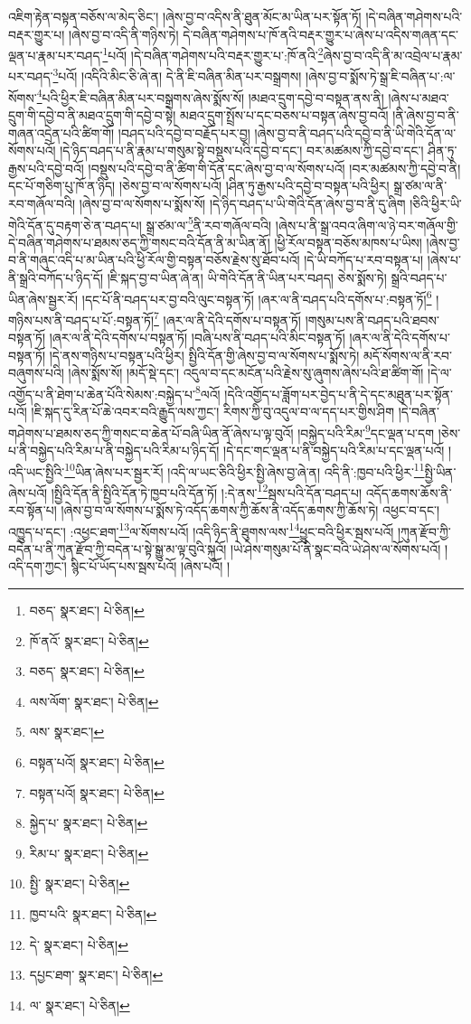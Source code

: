 འཇིག་རྟེན་བསྟན་བཅོས་ལ་མེད་ཅིང་། །ཞེས་བྱ་བ་འདིས་ནི་ཐུན་མོང་མ་ཡིན་པར་སྟོན་ཏོ། །དེ་བཞིན་གཤེགས་པའི་བརྡར་གྱུར་པ། །ཞེས་བྱ་བ་འདི་ནི་གཉིས་ཏེ། དེ་བཞིན་གཤེགས་པ་ཁོ་ནའི་བརྡར་གྱུར་པ་ཞེས་པ་འདིས་གཞན་དང་ལྡན་པ་རྣམ་པར་བཤད་\footnote{བཅད་  སྣར་ཐང་།  པེ་ཅིན། }པའོ། །དེ་བཞིན་གཤེགས་པའི་བརྡར་གྱུར་པ་:ཁོ་ནའི་\footnote{ཁོ་ནའོ་  སྣར་ཐང་།  པེ་ཅིན། }ཞེས་བྱ་བ་འདི་ནི་མ་འབྲེལ་པ་རྣམ་པར་བཤད་\footnote{བཅད་  སྣར་ཐང་།  པེ་ཅིན། }པའོ། །འདིའི་མིང་ཅི་ཞེ་ན། དེ་ནི་ཇི་བཞིན་མིན་པར་བསྒྲགས། །ཞེས་བྱ་བ་སྨོས་ཏེ་སྒྲ་ཇི་བཞིན་པ་:ལ་སོགས་\footnote{ལས་ལོག་  སྣར་ཐང་།  པེ་ཅིན། }པའི་ཕྱིར་ཇི་བཞིན་མིན་པར་བསྒྲགས་ཞེས་སྨོས་སོ། །མཐའ་དྲུག་དབྱེ་བ་བསྟན་ནས་ནི། །ཞེས་པ་མཐའ་དྲུག་གི་དབྱེ་བ་ནི་མཐའ་དྲུག་གི་དབྱེ་བ་སྟེ། མཐའ་དྲུག་སྤྲོས་པ་དང་བཅས་པ་བསྟན་ཞེས་བྱ་བའོ། །ནི་ཞེས་བྱ་བ་ནི་གཞན་འདྲེན་པའི་ཚིག་གོ། །བཤད་པའི་དབྱེ་བ་བརྗོད་པར་བྱ། །ཞེས་བྱ་བ་ནི་བཤད་པའི་དབྱེ་བ་ནི་ཡི་གེའི་དོན་ལ་སོགས་པའོ། །དེ་ཉིད་བཤད་པ་ནི་རྣམ་པ་གསུམ་སྟེ་བསྡུས་པའི་དབྱེ་བ་དང་། བར་མཚམས་ཀྱི་དབྱེ་བ་དང་། ཤིན་ཏུ་རྒྱས་པའི་དབྱེ་བའོ། །བསྡུས་པའི་དབྱེ་བ་ནི་ཚིག་གི་དོན་དང་ཞེས་བྱ་བ་ལ་སོགས་པའོ། །བར་མཚམས་ཀྱི་དབྱེ་བ་ནི། དང་པོ་གཅིག་པུ་ཁོ་ན་ཉིད། །ཅེས་བྱ་བ་ལ་སོགས་པའོ། །ཤིན་ཏུ་རྒྱས་པའི་དབྱེ་བ་བསྟན་པའི་ཕྱིར། སྒྲ་ཙམ་ལ་ནི་རབ་གཞོལ་བའི། །ཞེས་བྱ་བ་ལ་སོགས་པ་སྨོས་སོ། །དེ་ཉིད་བཤད་པ་ཡི་གེའི་དོན་ཞེས་བྱ་བ་ནི་དུ་ཞིག །ཅིའི་ཕྱིར་ཡི་གེའི་དོན་དུ་བརྟག་ཅེ་ན་བཤད་པ། སྒྲ་ཙམ་ལ་\footnote{ལས་  སྣར་ཐང་། }ནི་རབ་གཞོལ་བའི། །ཞེས་པ་ནི་སྒྲ་འབའ་ཞིག་ལ་ཉེ་བར་གཞོལ་གྱི་དེ་བཞིན་གཤེགས་པ་ཐམས་ཅད་ཀྱི་གསང་བའི་དོན་ནི་མ་ཡིན་ནོ། །ཕྱི་རོལ་བསྟན་བཅོས་མཁས་པ་ཡིས། །ཞེས་བྱ་བ་ནི་གཞུང་འདི་པ་མ་ཡིན་པའི་ཕྱི་རོལ་གྱི་བསྟན་བཅོས་རྗེས་སུ་ཐོབ་པའོ། །དེ་ཡི་བཀོད་པ་རབ་བསྟན་པ། །ཞེས་པ་ནི་སྒྲའི་བཀོད་པ་ཉིད་དོ། །ཇི་སྐད་བྱ་བ་ཡིན་ཞེ་ན། ཡི་གེའི་དོན་ནི་ཡིན་པར་བཤད། ཅེས་སྨོས་ཏེ། སྒྲའི་བཤད་པ་ཡིན་ཞེས་སྦྱར་རོ། །དང་པོ་ནི་བཤད་པར་བྱ་བའི་ལུང་བསྟན་ཏོ། །ཞར་ལ་ནི་བཤད་པའི་དགོས་པ་:བསྟན་ཏོ།\footnote{བསྟན་པའོ།  སྣར་ཐང་།  པེ་ཅིན། } །གཉིས་པས་ནི་བཤད་པ་པོ་:བསྟན་ཏོ།\footnote{བསྟན་པའོ།  སྣར་ཐང་།  པེ་ཅིན། } །ཞར་ལ་ནི་དེའི་དགོས་པ་བསྟན་ཏོ། །གསུམ་པས་ནི་བཤད་པའི་ཐབས་བསྟན་ཏོ། །ཞར་ལ་ནི་དེའི་དགོས་པ་བསྟན་ཏོ། །བཞི་པས་ནི་བཤད་པའི་མིང་བསྟན་ཏོ། །ཞར་ལ་ནི་དེའི་དགོས་པ་བསྟན་ཏོ། །དེ་ནས་གཉིས་པ་བསྟན་པའི་ཕྱིར། སྤྱིའི་དོན་གྱི་ཞེས་བྱ་བ་ལ་སོགས་པ་སྨོས་ཏེ། མདོ་སོགས་ལ་ནི་རབ་བཞུགས་པའི། །ཞེས་སྨོས་སོ། །མདོ་སྡེ་དང་། འདུལ་བ་དང་མངོན་པའི་རྗེས་སུ་ཞུགས་ཞེས་པའི་ཐ་ཚིག་གོ། །དེ་ལ་འགྱོད་པ་ནི་ཐེག་པ་ཆེན་པོའི་སེམས་:བསྐྱེད་པ་\footnote{སྐྱེད་པ་  སྣར་ཐང་།  པེ་ཅིན། }ལའོ། །དེའི་འགྱོད་པ་ཟློག་པར་བྱེད་པ་ནི་དེ་དང་མཐུན་པར་སྟོན་པའོ། །ཇི་སྐད་དུ་རིན་པོ་ཆེ་འབར་བའི་རྒྱུད་ལས་ཀྱང་། རིགས་ཀྱི་བུ་འདུལ་བ་ལ་དད་པར་གྱིས་ཤིག །དེ་བཞིན་གཤེགས་པ་ཐམས་ཅད་ཀྱི་གསང་བ་ཆེན་པོ་བཞི་ཡིན་ནོ་ཞེས་པ་ལྟ་བུའོ། །བསྐྱེད་པའི་རིམ་\footnote{རིམ་པ་  སྣར་ཐང་།  པེ་ཅིན། }དང་ལྡན་པ་དག །ཅེས་པ་ནི་བསྐྱེད་པའི་རིམ་པ་ནི་བསྐྱེད་པའི་རིམ་པ་ཉིད་དོ། །དེ་དང་གང་ལྡན་པ་ནི་བསྐྱེད་པའི་རིམ་པ་དང་ལྡན་པའོ། །འདི་ཡང་སྤྱིའི་\footnote{སྤྱི་  སྣར་ཐང་།  པེ་ཅིན། }ཡིན་ཞེས་པར་སྦྱར་རོ། །འདི་ལ་ཡང་ཅིའི་ཕྱིར་སྤྱི་ཞེས་བྱ་ཞེ་ན། འདི་ནི་:ཁྱབ་པའི་ཕྱིར་\footnote{ཁྱབ་པའི་  སྣར་ཐང་།  པེ་ཅིན། }སྤྱི་ཡིན་ཞེས་པའོ། །སྤྱིའི་དོན་ནི་སྤྱིའི་དོན་ཏེ་ཁྱབ་པའི་དོན་ཏོ། །:དེ་ནས་\footnote{དེ་  སྣར་ཐང་།  པེ་ཅིན། }སྦས་པའི་དོན་བཤད་པ། འདོད་ཆགས་ཆོས་ནི་རབ་སྟོན་པ། །ཞེས་བྱ་བ་ལ་སོགས་པ་སྨོས་ཏེ་འདོད་ཆགས་ཀྱི་ཆོས་ནི་འདོད་ཆགས་ཀྱི་ཆོས་ཏེ། འཕྱང་བ་དང་། འཁྱུད་པ་དང་། :འཕྱང་ཐག་\footnote{དཔྱང་ཐག་  སྣར་ཐང་།  པེ་ཅིན། }ལ་སོགས་པའོ། །འདི་ཉིད་ནི་ཐུགས་ལས་\footnote{ལ་  སྣར་ཐང་།  པེ་ཅིན། }ཕྱུང་བའི་ཕྱིར་སྦས་པའོ། །ཀུན་རྫོབ་ཀྱི་བདེན་པ་ནི་ཀུན་རྫོབ་ཀྱི་བདེན་པ་སྟེ་སྒྱུ་མ་ལྟ་བུའི་སྐུའོ། །ཡེ་ཤེས་གསུམ་པོ་ནི་སྣང་བའི་ཡེ་ཤེས་ལ་སོགས་པའོ། །འདི་དག་ཀྱང་། སྙིང་པོ་ཡོད་པས་སྦས་པའོ། །ཞེས་པའོ། །
